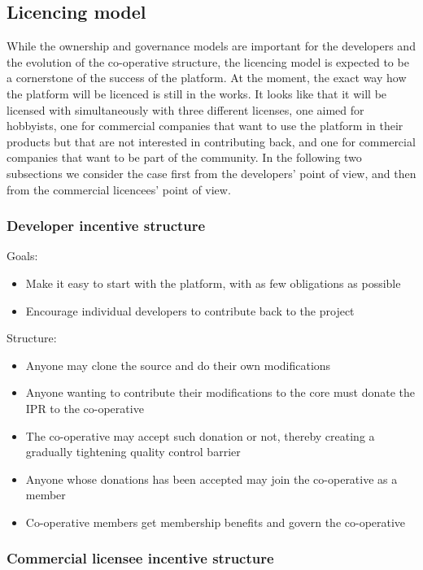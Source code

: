 \documentclass[draft,a4paper]{siamltex}
\begin{document}
\subsection{Licencing model}
\label{ssec:licencing}

While the ownership and governance models are important for the
developers and the evolution of the co-operative structure, the
licencing model is expected to be a cornerstone of the success of the
platform.  At the moment, the exact way how the platform will be
licenced is still in the works.  It looks like that it will be
licensed with simultaneously with three different licenses, one aimed
for hobbyists, one for commercial companies that want to use the
platform in their products but that are not interested in contributing
back, and one for commercial companies that want to be part of the
community.  In the following two subsections we consider the case
first from the developers' point of view, and then from the commercial
licencees' point of view.

\subsubsection{Developer incentive structure}

Goals:
\begin{itemize}
  \item Make it easy to start with the platform, with as few
    obligations as possible
  \item Encourage individual developers to contribute back to the
    project
\end{itemize}

Structure:
\begin{itemize}
  \item Anyone may clone the source and do their own modifications
  \item Anyone wanting to contribute their modifications to the core
    must donate the IPR to the co-operative
  \item The co-operative may accept such donation or not, thereby
    creating a gradually tightening quality control barrier
  \item Anyone whose donations has been accepted may join the
    co-operative as a member
  \item Co-operative members get membership benefits and govern the
    co-operative
\end{itemize}

\subsubsection{Commercial licensee incentive structure}
\end{document}
